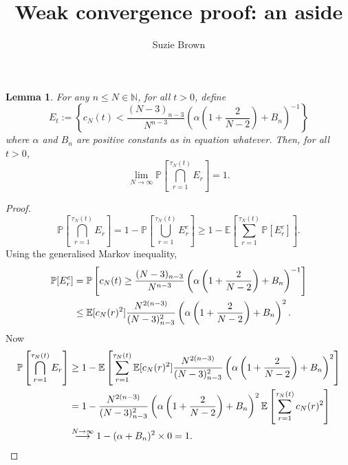 \documentclass{article}
\title{Weak convergence proof: an aside}
\author{Suzie Brown}
\newtheorem{lemma}{Lemma}
\newcommand{\Prob}{\mathbb{P}}
\newcommand{\E}{\mathbb{E}}
\newcommand{\1}[1]{\mathbb{I}_{#1}}
\begin{document}
\maketitle
\thispagestyle{fancy}

\begin{lemma}
For any $n \leq N \in \mathbb{N}$, for all $t>0$, define 
\begin{equation}
E_t := \left\{ c_N(t) < \frac{(N-3)_{n-3}}{N^{n-3}} \left( \alpha \left(1 + \frac{2}{N-2} \right) + B_n \right)^{-1} \right\} 
\end{equation}
where $\alpha$ and $B_n$ are positive constants as in equation whatever.
Then, for all $t>0$,
\begin{equation}
\lim_{N\to\infty} \Prob \left[  \bigcap_{r=1}^{\tau_N(t)} E_r \right] = 1 .
\end{equation}
\end{lemma}

\begin{proof}
\begin{equation}
\Prob \left[  \bigcap_{r=1}^{\tau_N(t)} E_r \right]
= 1 - \Prob \left[  \bigcup_{r=1}^{\tau_N(t)} E_r^c \right]
\geq 1 - \E \left[ \sum_{r=1}^{\tau_N(t)} \Prob [E_r^c] \right] .
\end{equation}
Using the generalised Markov inequality,
\begin{align}
\Prob [E_r^c] &= \Prob \left[ c_N(t) \geq \frac{(N-3)_{n-3}}{N^{n-3}} \left( \alpha \left(1 + \frac{2}{N-2} \right) + B_n \right)^{-1} \right] \notag\\
&\leq \E[c_N(r)^2] \frac{N^{2(n-3)}}{(N-3)_{n-3}^2} \left( \alpha \left(1 + \frac{2}{N-2} \right) + B_n \right)^2 .
\end{align}
Now
\begin{align}
\Prob \left[  \bigcap_{r=1}^{\tau_N(t)} E_r \right]
&\geq 1 - \E \left[  \sum_{r=1}^{\tau_N(t)} \E[c_N(r)^2] \frac{N^{2(n-3)}}{(N-3)_{n-3}^2} \left( \alpha \left(1 + \frac{2}{N-2} \right) + B_n \right)^2 \right] \notag\\
&= 1 - \frac{N^{2(n-3)}}{(N-3)_{n-3}^2} \left( \alpha \left(1 + \frac{2}{N-2} \right) + B_n \right)^2 
\E \left[ \sum_{r=1}^{\tau_N(t)} c_N(r)^2 \right] \notag\\
&\overset{N\to\infty}{\longrightarrow} 1 - (\alpha + B_n)^2 \times 0 = 1 .
\end{align}

\end{proof}
\end{document}
